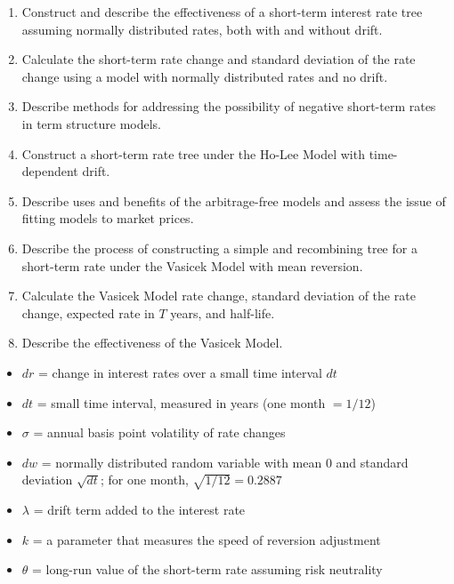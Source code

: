 
\begin{mrkeybox}[title={Learning objectives in this reading}]
\small
\begin{enumerate}[label=\textbf{\alph*.},leftmargin=1.7em]
\item Construct and describe the effectiveness of a short-term interest rate tree assuming
      normally distributed rates, both with and without drift.
\item Calculate the short-term rate change and standard deviation of the rate change using a
      model with normally distributed rates and no drift.
\item Describe methods for addressing the possibility of negative short-term rates in term
      structure models.
\item Construct a short-term rate tree under the Ho-Lee Model with time-dependent drift.
\item Describe uses and benefits of the arbitrage-free models and assess the issue of fitting
      models to market prices.
\item Describe the process of constructing a simple and recombining tree for a short-term rate
      under the Vasicek Model with mean reversion.
\item Calculate the Vasicek Model rate change, standard deviation of the rate change, expected
      rate in $T$ years, and half-life.
\item Describe the effectiveness of the Vasicek Model.
\end{enumerate}
\end{mrkeybox}

\begin{mrdefbox}[title={Notation used throughout this reading}]
\begin{itemize}
\item $dr$ = change in interest rates over a small time interval $dt$
\item $dt$ = small time interval, measured in years (one month $= 1/12$)
\item $\sigma$ = annual basis point volatility of rate changes
\item $dw$ = normally distributed random variable with mean 0 and standard deviation
      $\sqrt{dt}$; for one month, $\sqrt{1/12} = 0.2887$
\item $\lambda$ = drift term added to the interest rate
\item $k$ = a parameter that measures the speed of reversion adjustment
\item $\theta$ = long-run value of the short-term rate assuming risk neutrality
\end{itemize}
\end{mrdefbox}

